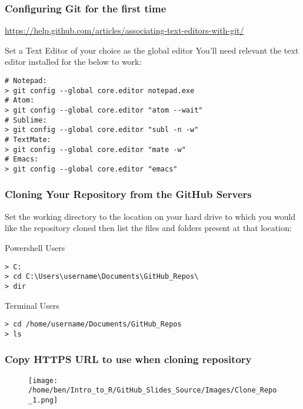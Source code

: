 \documentclass[xcolor=dvipsnames]{beamer}
\begin{document}
\begin{frame}[fragile]
\frametitle{Configuring Git for the first time}
\url{https://help.github.com/articles/associating-text-editors-with-git/}
\begin{block}{Set a Text Editor of your choice as the global editor}
You'll need relevant the text editor installed for the below to work:
\begin{lstlisting}
# Notepad:
> git config --global core.editor notepad.exe
# Atom:
> git config --global core.editor "atom --wait"
# Sublime:
> git config --global core.editor "subl -n -w"
# TextMate:
> git config --global core.editor "mate -w"
# Emacs:
> git config --global core.editor "emacs"
\end{lstlisting}
\end{block}

\end{frame}

\begin{frame}[fragile]
\frametitle{Cloning Your Repository from the GitHub Servers}

Set the working directory to the location on your hard drive to which you would like the repository cloned then list the files and folders present at that location:

\begin{block}{Powershell Users}
\begin{lstlisting}
> C:
> cd C:\Users\username\Documents\GitHub_Repos\
> dir 
\end{lstlisting}
\end{block}

\begin{block}{Terminal Users}
\begin{lstlisting}
> cd /home/username/Documents/GitHub_Repos
> ls 
\end{lstlisting}
\end{block}
\end{frame}

\begin{frame}
\frametitle{Copy HTTPS URL to use when cloning repository}
\begin{center}
\begin{figure}
\texttt{[image: /home/ben/Intro\_to\_R/GitHub\_Slides\_Source/Images/Clone\_Repo\_1.png]}
\end{figure}
\end{center}
\end{frame}
\end{document}
